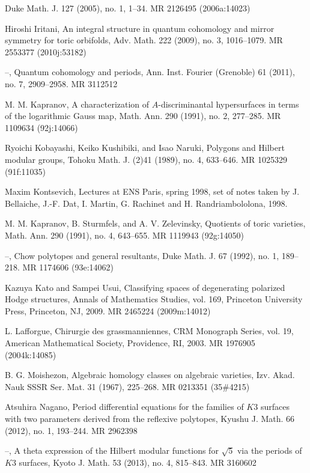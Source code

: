 \begin{list}{}{%
  \setlength{\leftmargin}{5.4em}%
  \setlength{\labelwidth}{4.8em}%
  \setlength{\labelsep}{0.6em}%
  \setlength{\itemsep}{1.5pt}%
  \setlength{\parsep}{0pt}}
  Duke Math. J. 127 (2005), no. 1, 1–34. MR 2126495 (2006a:14023)
\item[{[Iri09]}] Hiroshi Iritani, An integral structure in quantum cohomology and mirror
  symmetry for toric orbifolds, Adv. Math. 222 (2009), no. 3, 1016–1079.
  MR 2553377 (2010j:53182)
\item[{[Iri11]}] --, Quantum cohomology and periods, Ann. Inst. Fourier (Grenoble) 61
  (2011), no. 7, 2909–2958. MR 3112512
\item[{[Kap91]}] M. M. Kapranov, A characterization of $A$-discriminantal hypersurfaces in
  terms of the logarithmic Gauss map, Math. Ann. 290 (1991), no. 2, 277–285.
  MR 1109634 (92j:14066)
\item[{[KKN89]}] Ryoichi Kobayashi, Keiko Kushibiki, and Isao Naruki, Polygons and Hilbert
  modular groups, Tohoku Math. J. (2)41 (1989), no. 4, 633–646. MR 1025329 (91f:11035)
\item[{[Kon98]}] Maxim Kontsevich, Lectures at ENS Paris, spring 1998, set of notes taken by
  J. Bellaiche, J.-F. Dat, I. Martin, G. Rachinet and H. Randriambololona, 1998.
\item[{[KSZ91]}] M. M. Kapranov, B. Sturmfels, and A. V. Zelevinsky, Quotients of toric
  varieties, Math. Ann. 290 (1991), no. 4, 643–655. MR 1119943 (92g:14050)
\item[{[KSZ92]}] --, Chow polytopes and general resultants, Duke Math. J. 67 (1992), no. 1,
  189–218. MR 1174606 (93e:14062)
\item[{[KU09]}] Kazuya Kato and Sampei Usui, Classifying spaces of degenerating polarized
  Hodge structures, Annals of Mathematics Studies, vol. 169, Princeton University Press,
  Princeton, NJ, 2009. MR 2465224 (2009m:14012)
\item[{[Laf03]}] L. Lafforgue, Chirurgie des grassmanniennes, CRM Monograph Series, vol. 19,
  American Mathematical Society, Providence, RI, 2003. MR 1976905 (2004k:14085)
\item[{[Moi67]}] B. G. Moishezon, Algebraic homology classes on algebraic varieties,
  Izv. Akad. Nauk SSSR Ser. Mat. 31 (1967), 225–268. MR 0213351 (35\#4215)
\item[{[Nag12]}] Atsuhira Nagano, Period differential equations for the families of $K3$
  surfaces with two parameters derived from the reflexive polytopes, Kyushu J. Math. 66
  (2012), no. 1, 193–244. MR 2962398
\item[{[Nag13]}] --, A theta expression of the Hilbert modular functions for $\sqrt{5}$ via
  the periods of $K3$ surfaces, Kyoto J. Math. 53 (2013), no. 4, 815–843. MR 3160602

\end{list}
